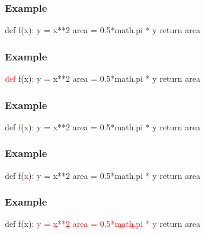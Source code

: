 \documentclass[11pt]{beamer}
\begin{document}
\begin{frame}[fragile]
  \frametitle{Example}
  \Enlarge

 
  \begin{semiverbatim} 
def f(x):
    y = x**2 
    area = 0.5*math.pi * y 
    return area
  \end{semiverbatim}

\end{frame}

\begin{frame}[fragile]
  \frametitle{Example}
  \Enlarge

 
  \begin{semiverbatim} 
\textcolor{red}{def} f(x)\textcolor{red}{:}
    y = x**2 
    area = 0.5*math.pi * y 
    return area
  \end{semiverbatim}

\end{frame}

\begin{frame}[fragile]
  \frametitle{Example}
  \Enlarge

 
  \begin{semiverbatim} 
def \textcolor{red}{f}(x):
    y = x**2 
    area = 0.5*math.pi * y
    return area
  \end{semiverbatim}

\end{frame}

\begin{frame}[fragile]
  \frametitle{Example}
  \Enlarge

 
  \begin{semiverbatim} 
def f(\textcolor{red}{x}):
    y = x**2 
    area = 0.5*math.pi * y
    return area
  \end{semiverbatim}

\end{frame}

\begin{frame}[fragile]
  \frametitle{Example}
  \Enlarge

 
  \begin{semiverbatim} 
def f(x):
    \textcolor{red}{y = x**2} 
    \textcolor{red}{area = 0.5*math.pi * y} 
    return area
  \end{semiverbatim}

\end{frame}
\end{document}
